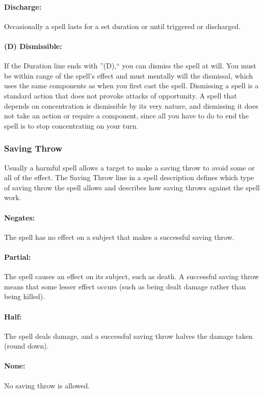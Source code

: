 \paragraph{Discharge:} Occasionally a spell lasts for a set duration or until triggered or discharged.

\paragraph{(D) Dismissible:} If the Duration line ends with ''(D),`` you can dismiss the spell at will. You must be within range of the spell's effect and must mentally will the dismissal, which uses the same components as when you first cast the spell. Dismissing a spell is a standard action that does not provoke attacks of opportunity. A spell that depends on concentration is dismissible by its very nature, and dismissing it does not take an action or require a component, since all you have to do to end the spell is to stop concentrating on your turn.

\subsubsection{Saving Throw}
\label{sec:SavingThrow}
Usually a harmful spell allows a target to make a saving throw to avoid some or all of the effect. 
The Saving Throw line in a spell description defines which type of saving throw the spell allows and describes how saving throws against the spell work.

\paragraph{Negates:} The spell has no effect on a subject that makes a successful saving throw.

\paragraph{Partial:} The spell causes an effect on its subject, such as death. A successful saving throw means that some lesser effect occurs (such as being dealt damage rather than being killed).

\paragraph{Half:} The spell deals damage, and a successful saving throw halves the damage taken (round down). 

\paragraph{None:} No saving throw is allowed.

